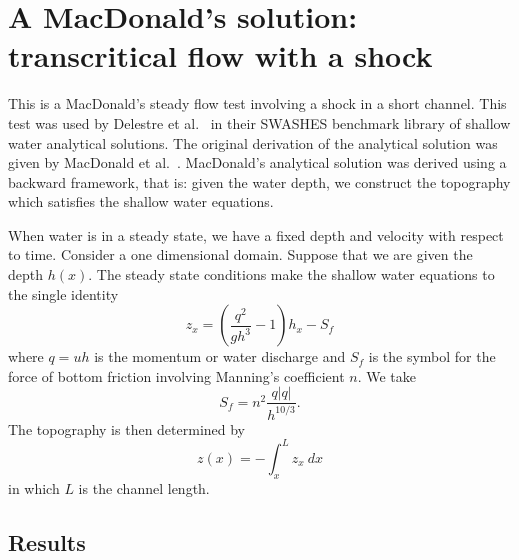 
\section{A MacDonald's solution: transcritical flow with a shock}

This is a MacDonald's steady flow test involving a shock in a short channel. This test was used by Delestre et al.~\cite{Delestre-etal2012} in their \textsc{SWASHES} benchmark library of shallow water analytical solutions. The original derivation of the analytical solution was given by MacDonald et al.~\cite{MBNS1995, MBNS1997}.
MacDonald's analytical solution was derived using a backward framework, that is: given the water depth, we construct the topography which satisfies the shallow water equations.

When water is in a steady state, we have a fixed depth and velocity with respect to time. Consider a one dimensional domain. Suppose that we are given the depth $h(x)$. The steady state conditions make the shallow water equations to the single identity
\begin{equation}
z_x = \left(  \frac{q^2}{gh^3} -1 \right) h_x - S_f
\end{equation}
where $q=uh$ is the momentum or water discharge and $S_f$ is the symbol for the force of bottom friction involving Manning's coefficient $n$. We take 
\begin{equation}
S_f = n^2 \frac{q|q|}{h^{10/3}}.
\end{equation}
The topography is then determined by
\begin{equation}
z(x) = -\int_{x}^{L} z_x~dx
\end{equation}
in which $L$ is the channel length.

\subsection{Results}


